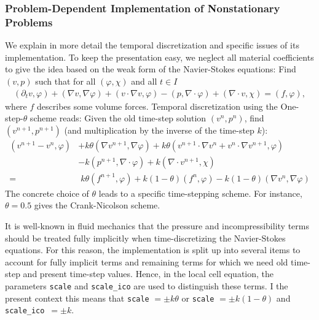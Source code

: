 \documentclass[smallextended]{svjour3}       %
\numberwithin{equation}{section}
\renewcommand{\phi}{\varphi}
\begin{document}
\subsubsection{Problem-Dependent 
Implementation of Nonstationary Problems}
\label{sec:timedep:implementation}
We explain in more detail the temporal discretization
and specific issues of its implementation. 
To keep the presentation easy, we neglect
all material coefficients
to give the idea based on the weak 
form of the Navier-Stokes equations:
Find $(v,p)$ such that for all $(\phi,\chi)$ 
and all $t \in I$
\begin{align*}
(\partial_t v,\phi) 
+ (\nabla v, \nabla \phi)
+ (v\cdot\nabla v,\phi)
-(p,\nabla\cdot \phi)
+(\nabla\cdot v, \chi)
=(f,\phi),
\end{align*}
where $f$ describes some volume forces.
Temporal discretization using the One-step-$\theta$ scheme reads:
Given the old time-step solution $(v^n,p^n)$, 
find $(v^{n+1}, p^{n+1})$ (and multiplication 
by the inverse of the time-step $k$):
\begin{align*}
(v^{n+1} - v^{n}, \phi)
&+ k\theta (\nabla v^{n+1}, \nabla \phi)
+ k\theta (v^{n+1}\cdot\nabla v^n + 
  v^{n}\cdot\nabla v^{n+1},\phi)\\
&- k (p^{n+1},\nabla\cdot \phi)
+ k(\nabla\cdot v^{n+1}, \chi)\\
=&\; k\theta (f^{n+1},\phi) + k(1-\theta) (f^{n},\phi)
- k(1-\theta) (\nabla v^{n}, \nabla \phi) 
\end{align*}
The concrete choice of $\theta$ leads to a
specific time-stepping scheme. For instance,
$\theta = 0.5$ gives the Crank-Nicolson scheme.

It is well-known in fluid mechanics that the pressure and incompressibility terms should be 
treated fully implicitly when time-discretizing 
the Navier-Stokes equations.
For this reason, the implementation is split up
into several items to account for fully implicit 
terms and remaining terms for which we need 
old time-step and present time-step values. 
Hence, in the local cell equation, the parameters
\texttt{scale} and \texttt{scale\_ico}
are used to distinguish these terms.
I the present context this means that 
\texttt{scale} $= \pm k\theta$ or \texttt{scale} $= \pm k(1-\theta)$ and
\texttt{scale\_ico}~$= \pm k$.
\end{document}
